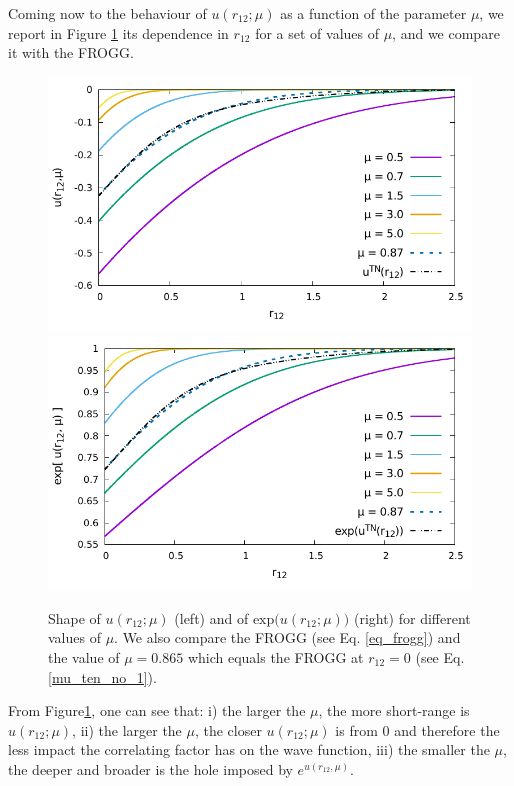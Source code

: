\documentclass[aip,jcp,reprint,noshowkeys,superscriptaddress,twocolumn]{revtex4-1}
\begin{document}
Coming now to the behaviour of $u(r_{12};\mu)$ as a function of the parameter $\mu$, we report in Figure \ref{fig_j_mu} its dependence in $r_{12}$ for a set of values of $\mu$, and we compare it with the FROGG. 
\begin{figure}
        \includegraphics[width=0.45\linewidth]{plots/jastrow/small_mu_j.pdf}
        \includegraphics[width=0.45\linewidth]{plots/jastrow/small_mu_exp_j.pdf}\\
        \caption{Shape of $u(r_{12};\mu)$ (left) and of $\text{exp}\big(u(r_{12};\mu) \big) $ (right) for different values of $\mu$. 
We also compare the FROGG (see Eq. \eqref{eq_frogg}) and the value of $\mu = 0.865$ which equals the FROGG at $r_{12}=0$ (see Eq. \eqref{mu_ten_no_1}). }
 \label{fig_j_mu}
\end{figure}
From Figure\ref{fig_j_mu}, one can see that: i) the larger the $\mu$, the more short-range is $u(r_{12};\mu)$, ii) the larger the $\mu$, the closer $u(r_{12};\mu)$ is from 0 and therefore the less impact the correlating factor has on the wave function, iii) the smaller the $\mu$, the deeper and broader is the hole imposed by $e^{u(r_{12},\mu)}$. 
\end{document}
